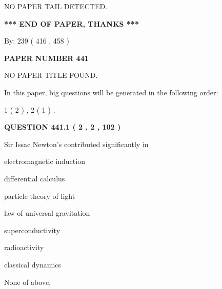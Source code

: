 \documentclass[12pt]{article}
\begin{document}
   
   
   
\vspace{2.0in} NO PAPER TAIL DETECTED.
   
   
   
   
\vspace{1.0in} 
{\textbf{\large{ *** END OF PAPER, THANKS *** }}} 
   
   
\hspace{1.0in} By: 
 239 ( 416 ,  458 )
   
   
   
   
\newpage 
\setcounter{page}{ 
   441001 } 
   
   
   
   
 {\textbf{ \Large{ PAPER NUMBER  441  }}}
   
   
\vspace{0.2in}
   
   
   
   
   
   
 NO PAPER TITLE FOUND.
   
   
   
\vspace{0.2in}
   
In this paper, big questions will be generated in the following order: 
   
   
   1 ( 2 )
 ,
   2 ( 1 )
 .
  
\vspace{0.2in}
  
{\textbf{\Large{QUESTION
441.1 
 ( 2 , 2 , 102 )
}}}
  
  
Sir Issac Newton's contributed significantly in
 
 
electromagnetic induction
 
 
differential calculus
 
 
particle theory of light
 
 
law of universal gravitation
 
 
superconductivity
 
 
radioactivity
 
 
classical dynamics
 
 
 None of above.
 
 
\noindent{}
 
\end{document}
